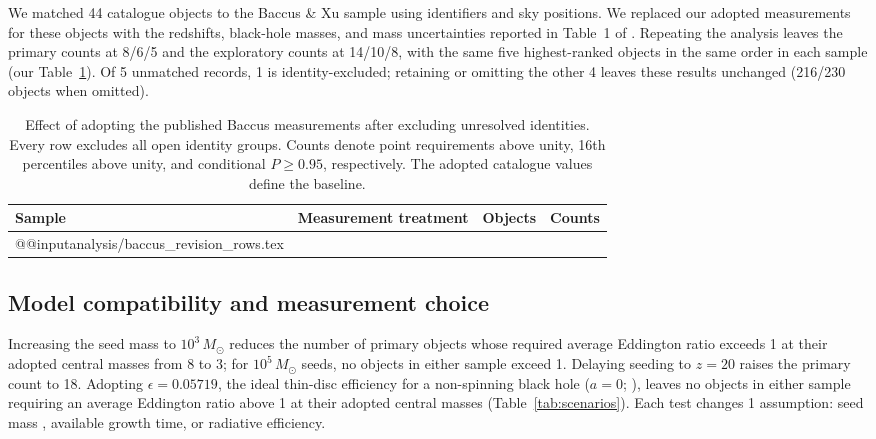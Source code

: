 \documentclass[11pt]{article}
\makeatletter
\newcommand{\tableinput}[1]{\csname @@input\endcsname #1 }
\makeatother
\begin{document}
We matched 44 catalogue objects to the Baccus \& Xu sample using identifiers
and sky positions. We replaced our adopted measurements for these objects with
the redshifts, black-hole masses, and mass uncertainties reported in Table~1
of \citet{baccus2026}. Repeating the analysis leaves the primary counts at
8/6/5 and the exploratory counts at 14/10/8, with the same five highest-ranked
objects in the same order in each sample (our Table~\ref{tab:baccusjoint}). Of 5 unmatched records, 1 is identity-excluded; retaining
or omitting the other 4 leaves these results unchanged (216/230 objects
when omitted).

\begin{table}[htbp]
\centering\small
\caption{Effect of adopting the published Baccus measurements after excluding unresolved identities.
Every row excludes all open identity groups. Counts denote point requirements
above unity, 16th percentiles above unity, and conditional $P\geq0.95$,
respectively. The adopted catalogue values define the baseline.}
\begin{tabular}{@{}llrr@{}}
\toprule
Sample & Measurement treatment & Objects & Counts \\
\midrule
\tableinput{analysis/baccus_revision_rows.tex}
\bottomrule
\end{tabular}
\label{tab:baccusjoint}
\end{table}

\FloatBarrier
\subsection{Model compatibility and measurement choice}

Increasing the seed mass to $10^3\,M_\odot$ reduces the number of primary objects
whose required average Eddington ratio exceeds 1 at their adopted central masses
from 8 to 3; for $10^5\,M_\odot$ seeds, no objects in either sample exceed 1.
Delaying seeding to $z=20$ raises the primary count to 18. Adopting
$\epsilon=0.05719$, the ideal thin-disc efficiency for a non-spinning black hole
($a=0$; \citealt{bardeen1972}), leaves no objects in either sample requiring
an average Eddington ratio above 1 at their adopted central masses
(Table~\ref{tab:scenarios}). Each test changes 1 assumption: seed mass
\citep{dayal2024}, available growth time, or radiative efficiency.
\end{document}
